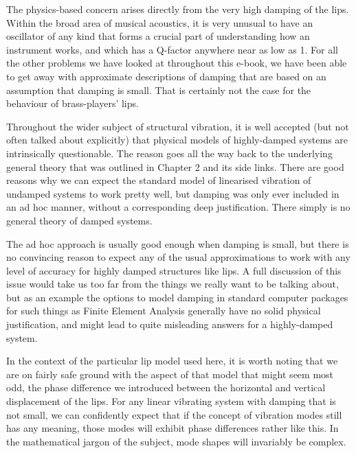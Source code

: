   The physics-based concern arises directly from the very high damping of the 
  lips. Within the broad area of musical acoustics, it is very unusual to have 
  an oscillator of any kind that forms a crucial part of understanding how an 
  instrument works, and which has a Q-factor anywhere near as low as 1. For all 
  the other problems we have looked at throughout this e-book, we have been 
  able to get away with approximate descriptions of damping that are based on 
  an assumption that damping is small. That is certainly not the case for the 
  behaviour of brass-players’ lips. 

  Throughout the wider subject of structural vibration, it is well accepted 
  (but not often talked about explicitly) that physical models of highly-damped 
  systems are intrinsically questionable. The reason goes all the way back to 
  the underlying general theory that was outlined in Chapter 2 and its side 
  links. There are good reasons why we can expect the standard model of 
  linearised vibration of undamped systems to work pretty well, but damping was 
  only ever included in an ad hoc manner, without a corresponding deep 
  justification. There simply is no general theory of damped systems. 

  The ad hoc approach is usually good enough when damping is small, but there 
  is no convincing reason to expect any of the usual approximations to work 
  with any level of accuracy for highly damped structures like lips. A full 
  discussion of this issue would take us too far from the things we really want 
  to be talking about, but as an example the options to model damping in 
  standard computer packages for such things as Finite Element Analysis 
  generally have no solid physical justification, and might lead to quite 
  misleading answers for a highly-damped system. 

  In the context of the particular lip model used here, it is worth noting that 
  we are on fairly safe ground with the aspect of that model that might seem 
  most odd, the phase difference we introduced between the horizontal and 
  vertical displacement of the lips. For any linear vibrating system with 
  damping that is not small, we can confidently expect that if the concept of 
  vibration modes still has any meaning, those modes will exhibit phase 
  differences rather like this. In the mathematical jargon of the subject, mode 
  shapes will invariably be complex. 

